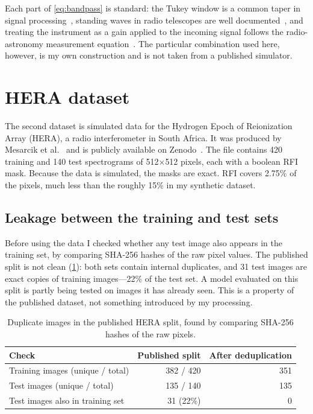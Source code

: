 Each part of \cref{eq:bandpass} is standard: the Tukey window is a common
taper in signal processing~\cite{harris1978}, standing waves in radio
telescopes are well documented~\cite{popping2008}, and treating the instrument
as a gain applied to the incoming signal follows the radio-astronomy
measurement equation~\cite{hamaker1996}. The particular combination used here,
however, is my own construction and is not taken from a published simulator.

\section{HERA dataset}
\label{sec:hera}
The second dataset is simulated data for the Hydrogen Epoch of Reionization
Array (HERA), a radio interferometer in South Africa. It was produced by
Mesarcik et al.~\cite{mesarcik2022} and is publicly available on
Zenodo~\cite{mesarcik2022data}. The file contains 420 training and 140 test
spectrograms of 512$\times$512 pixels, each with a boolean RFI mask. Because
the data is simulated, the masks are exact. RFI covers 2.75\% of the pixels,
much less than the roughly 15\% in my synthetic dataset.

\subsection{Leakage between the training and test sets}
Before using the data I checked whether any test image also appears in the
training set, by comparing SHA-256 hashes of the raw pixel values. The
published split is not clean (\cref{tab:hera_leak}): both sets contain
internal duplicates, and 31 test images are exact copies of training
images---22\% of the test set. A model evaluated on this split is partly being
tested on images it has already seen. This is a property of the published
dataset, not something introduced by my processing.

\begin{table}[H]
  \centering
  \caption{Duplicate images in the published HERA split, found by comparing
    SHA-256 hashes of the raw pixels.}
  \label{tab:hera_leak}
  \begin{tabular}{lrr}
    \toprule
    Check & Published split & After deduplication \\
    \midrule
    Training images (unique / total) & 382 / 420 & 351 \\
    Test images (unique / total)     & 135 / 140 & 135 \\
    Test images also in training set & 31 (22\%) & 0 \\
    \bottomrule
  \end{tabular}
\end{table}

